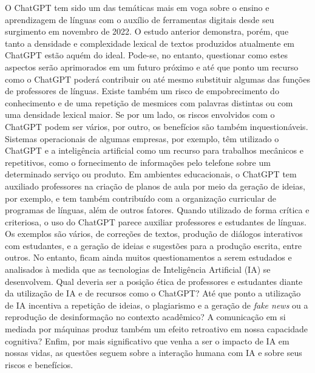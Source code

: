 \documentclass[portuguese]{textolivre}
\begin{document}
O ChatGPT tem sido um das temáticas mais em voga sobre o ensino e aprendizagem de línguas com o auxílio de ferramentas digitais desde seu surgimento em novembro de 2022. O estudo anterior demonstra, porém, que tanto a densidade e complexidade lexical de textos produzidos atualmente em ChatGPT estão aquém do ideal. Pode-se, no entanto, questionar como estes aspectos serão aprimorados em um futuro próximo e até que ponto um recurso como o ChatGPT poderá contribuir ou até mesmo substituir algumas das funções de professores de línguas. Existe também um risco de empobrecimento do conhecimento e de uma repetição de mesmices com palavras distintas ou com uma densidade lexical maior. Se por um lado, os riscos envolvidos com o ChatGPT podem ser vários, por outro, os benefícios são também inquestionáveis. Sistemas operacionais de algumas empresas, por exemplo, têm utilizado o ChatGPT e a inteligência artificial como um recurso para trabalhos mecânicos e repetitivos, como o fornecimento de informações pelo telefone sobre um determinado serviço ou produto. Em ambientes educacionais, o ChatGPT tem auxiliado professores na criação de planos de aula por meio da geração de ideias, por exemplo, e tem também contribuído com a organização curricular de programas de línguas, além de outros fatores. Quando utilizado de forma crítica e criteriosa, o uso do ChatGPT parece auxiliar professores e estudantes de línguas. Os exemplos são vários, de correções de textos, produção de diálogos interativos com estudantes, e a geração de ideias e sugestões para a produção escrita, entre outros. No entanto, ficam ainda muitos questionamentos a serem estudados e analisados à medida que as tecnologias de Inteligência Artificial (IA) se desenvolvem. Qual deveria ser a posição ética de professores e estudantes diante da utilização de IA e de recursos como o ChatGPT? Até que ponto a utilização de IA incentiva a repetição de ideias, o plagiarismo e a geração de \textit{fake news} ou a reprodução de desinformação no contexto acadêmico? A comunicação em si mediada por máquinas produz também um efeito retroativo em nossa capacidade cognitiva? Enfim, por mais significativo que venha a ser o impacto de IA em nossas vidas, as questões seguem sobre a interação humana com IA e sobre seus riscos e benefícios. 
\end{document}
